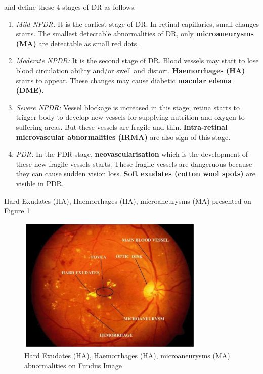 \citet{NationalEyeInstitute} and \citet{wilkinson2003proposed} define these 4 stages of DR as follows:
\begin{enumerate}
        \item \textit{Mild NPDR:} It is the earliest stage of DR. In retinal capillaries, small changes starts. The smallest detectable abnormalities of DR, only \textbf{microaneurysms (MA)} are detectable as small red dots.
        \item \textit{Moderate NPDR:} It is the second stage of DR. Blood vessels may start to lose blood circulation ability and/or swell and distort. \textbf{Haemorrhages (HA)} starts to appear. These changes may cause diabetic \textbf{macular edema (DME)}.  
        \item \textit{Severe NPDR:} Vessel blockage is increased in this stage; retina starts to trigger body to develop new vessels for supplying nutrition and oxygen to suffering areas. But these vessels are fragile and thin. \textbf{Intra-retinal microvascular abnormalities (IRMA)} are also sign of this stage. 
        \item \textit{PDR:} In the PDR stage, \textbf{neovascularisation} which is the development of these new fragile vessels starts. These fragile vessels  are dangeruous because they can cause sudden vision loss. \textbf{Soft exudates (cotton wool spots)} are visible in PDR. 
\end{enumerate}


Hard Exudates (HA), Haemorrhages (HA), microaneurysms (MA) presented on Figure \ref{AbnormalitiesFundusImage}

\begin{figure}[t]
\caption{Hard Exudates (HA), Haemorrhages (HA), microaneurysms (MA) abnormalities on Fundus Image \citep{kekre2013hybrid}}
\label{AbnormalitiesFundusImage}
\centering
\includegraphics[width=0.8\textwidth]{Figures/retina_abnormalities}
\end{figure}

